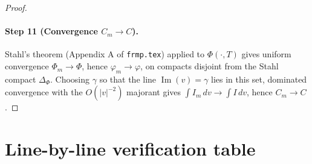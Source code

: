\documentclass{article}
\begin{document}
\begin{proof}
\paragraph{Step 11 (Convergence $C_m\to C$).}
Stahl's theorem (Appendix A of \texttt{frmp.tex}) applied to
$\Phi(\cdot,T)$ gives uniform convergence $\Phi_m\to\Phi$, hence
$\varphi_m\to\varphi$, on compacts disjoint from the Stahl compact
$\Delta_\Phi$.  Choosing $\gamma$ so that the line
$\operatorname{Im}(v)=\gamma$ lies in this set, dominated convergence
with the $O(|v|^{-2})$ majorant gives
$\int I_m\,dv\to\int I\,dv$, hence $C_m\to C$.
\end{proof}

\section*{Line-by-line verification table}
\end{document}

